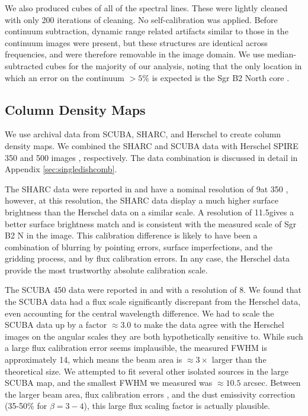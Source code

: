 \documentclass{emulateapj}
\begin{document}
We also produced cubes of all of the spectral lines.  These were lightly
cleaned with only 200 iterations of cleaning.  No self-calibration was applied.
Before continuum subtraction, dynamic range related artifacts similar to those
in the continuum images were present, but these structures are identical across
frequencies, and were therefore removable in the image domain.  We use
median-subtracted cubes for the majority of our analysis, noting that the only
location in which an error on the continuum $>5\%$ is expected is the Sgr B2
North core \citep{Sanchez-Monge2017a}.

\subsection{Column Density Maps}
We use archival data from SCUBA, SHARC, and Herschel to create column density
maps.  We combined the SHARC and SCUBA data with Herschel SPIRE 350 and 500 \um
images \citep{Molinari2010a}, respectively.  The data combination is discussed
in detail in Appendix \ref{sec:singledishcomb}.  

The SHARC data were reported in \citet{Bally2010a} and have a nominal
resolution of 9\arcsec at 350 \um, however, at this resolution,
the SHARC data display a much higher surface brightness than the Herschel
data on a similar scale.  A resolution of 11.5\arcsec gives a better
surface brightness match and is consistent with the measured scale of Sgr
B2 N in the image.  This calibration difference is likely to have been a
combination of blurring by pointing errors, surface imperfections, and
the gridding process, and by flux calibration errors.  In any case, the
Herschel data provide the most trustworthy absolute calibration scale.

The SCUBA 450 \um data were reported in \citet{Pierce-Price2000a} and
\citet{di-Francesco2008a} with a resolution of 8\arcsec.  We found that the
SCUBA data had a flux scale significantly discrepant from the Herschel data,
even accounting for the central wavelength difference.  We had to scale the
SCUBA data up by a factor $\approx3.0$ to make the data agree with the Herschel
images on the angular scales they are both hypothetically sensitive to.
While such a large flux calibration error seems implausible, the measured
FWHM is approximately 14\arcsec, which means the beam area is $\approx3\times$
larger than the theoretical size.  We attempted to fit several other isolated
sources in the large SCUBA map, and the smallest FWHM we measured was $\approx10.5$
arcsec.  Between the larger beam area, flux calibration errors \citep[quoted at
20\% in][]{Pierce-Price2000a}, and the dust emissivity correction (35-50\% for
$\beta=3-4$), this large flux scaling factor is actually plausible.  
\end{document}
